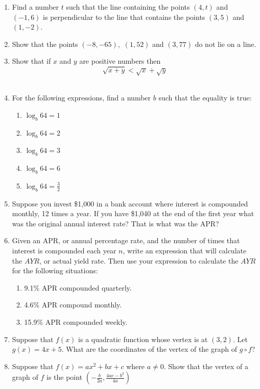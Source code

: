 \documentclass[11pt]{amsart}
\begin{document}
\begin{enumerate}

\item Find a number $t$ such that the line containing the points $(4,t)$ and $(-1,6)$ is perpendicular to the line that contains the points $(3,5)$
and $(1, -2)$.  \\

\item Show that the points $(-8, -65),$ $ ( 1,52) $ and $(3, 77) $ do not lie on a line.  \\


\item Show that if $x$ and $y$ are positive numbers then $$\sqrt{x+y} < \sqrt{x} + \sqrt{y} $$\\



\item For the following expressions, find a number $b$ such that the equality is true:
\begin{enumerate}
\item$ \log_b 64 = 1 $

\item$ \log_b 64 = 2 $
\item$ \log_b 64 = 3 $
\item$ \log_b 64 = 6 $
\item$ \log_b 64 = \frac{3}{2} $\\
\end{enumerate}

\item Suppose you invest \$1,000  in a bank account where interest is compounded monthly, 12 times a year.  If you have \$1,040 at the end of the first
year what was the original annual interest rate? That is what was the APR?\\

\item Given an APR, or annual percentage rate, and the number of times that interest is compounded each year $n$, write an expression that will calculate
the $AYR$, or actual yield rate.   Then use your expression to calculate the $AYR$ for the following situations: 
\begin{enumerate}
\item 9.1\% APR compounded quarterly. 
\item 4.6\% APR compound monthly. 
\item 15.9\% APR compounded weekly. \\
\end{enumerate}


\item Suppose that $f(x)$ is a quadratic function whose vertex is at $(3,2)$. Let $g(x) = 4x+ 5$.  What
are the coordinates of the vertex of the graph of $g\circ f $? \\


\item   Suppose that $f(x)  = ax^2 + bx + c$ where $a\neq 0$.    Show that the vertex of a graph of $f$
is the point $( -\frac{b}{2a} , \frac{4ac - b^2 }{ 4a} )$


\end{enumerate}
\end{document}
